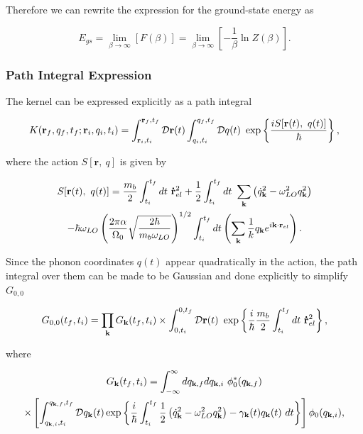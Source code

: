 Therefore we can rewrite the expression for the ground-state energy as

\begin{equation}
    E_{gs} = \lim_{\beta \to \infty}\left[F(\beta) \right] = \lim_{\beta \to \infty} \left[-\frac{1}{\beta} \ln Z(\beta) \right].
\end{equation}

\subsubsection{Path Integral Expression}
\label{subsubsec:2-2-1-1}

The kernel can be expressed explicitly as a path integral

\begin{equation}
    K(\vb{r}_f, q_f, t_f; \vb{r}_i, q_i, t_i) = \int_{\vb{r}_i, t_i}^{\vb{r}_f, t_f} \mathcal{D} \vb{r}(t) \int_{q_i, t_i}^{q_f, t_f} \mathcal{D}q(t)\ \exp\left\{{\frac{iS[\vb{r}(t),\ q(t)]}{\hbar}}\right\},
\end{equation}

where the action $S[\mathbf{r},\ q]$ is given by

\begin{equation}
\begin{gathered}
    S[\mathbf{r}(t),\ q(t)] = \frac{m_b}{2} \int_{t_i}^{t_f} dt\ \vb{\dot{r}}^2_{el} + \frac{1}{2} \int_{t_i}^{t_f} dt\ \sum_{\vb{k}} \left( \dot{q}_{\vb{k}}^2 - \omega_{LO}^2 q_{\vb{k}}^2 \right) \\
    - \hbar \omega_{LO} \left(\frac{2 \pi \alpha}{\Omega_0} \sqrt{\frac{2 \hbar}{m_b \omega_{LO}}}\right)^{1/2} \int_{t_i}^{t_f} dt \left( \sum_{\vb{k}} \frac{1}{k} q_{\vb{k}} e^{i \vb{k} \cdot \vb{r}_{el}} \right). 
\end{gathered}
\end{equation}

Since the phonon coordinates $q(t)$ appear quadratically in the action, the path integral over them can be made to be Gaussian and done explicitly to simplify $G_{0,0}$

\begin{equation}
    G_{0,0}(t_f, t_i) = \prod_{\vb{k}} G_{\vb{k}}(t_f, t_i) \times \int^{0, t_f}_{0, t_i} \mathcal{D}\vb{r}(t)\ \exp\left\{ \frac{i}{\hbar}  \frac{m_b}{2} \int^{t_f}_{t_i} dt\ \vb{\dot{r}}_{el}^2  \right\},
\end{equation}

where

\begin{equation}
\begin{gathered}
    G_{\vb{k}}(t_f, t_i) = \int_{-\infty}^{\infty} dq_{\vb{k}, f} dq_{\vb{k}, i}\ \phi_0^*(q_{\vb{k}, f}) \\
    \times \left[\int^{q_{\vb{k},f}, t_f}_{q_{\vb{k}, i}, t_i} \mathcal{D}q_{\vb{k}}(t) \exp \left\{\frac{i}{\hbar} \int_{t_i}^{t_f} \frac{1}{2}\left(\dot{q}_{\vb{k}}^2 - \omega_{LO}^2 q_{\vb{k}}^2 \right) - \gamma_{\vb{k}}(t) q_{\vb{k}}(t)\ dt \right\} \right] \phi_0(q_{\vb{k}, i}),
\end{gathered}
\end{equation}

